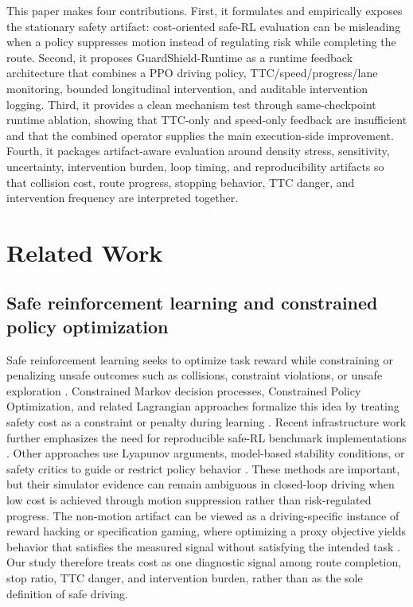 \documentclass[pdflatex,sn-mathphys-ay]{sn-jnl}
\begin{document}
This paper makes four contributions. First, it formulates and empirically exposes the stationary safety artifact: cost-oriented safe-RL evaluation can be misleading when a policy suppresses motion instead of regulating risk while completing the route. Second, it proposes GuardShield-Runtime as a runtime feedback architecture that combines a PPO driving policy, TTC/speed/progress/lane monitoring, bounded longitudinal intervention, and auditable intervention logging. Third, it provides a clean mechanism test through same-checkpoint runtime ablation, showing that TTC-only and speed-only feedback are insufficient and that the combined operator supplies the main execution-side improvement. Fourth, it packages artifact-aware evaluation around density stress, sensitivity, uncertainty, intervention burden, loop timing, and reproducibility artifacts so that collision cost, route progress, stopping behavior, TTC danger, and intervention frequency are interpreted together.

\section{Related Work}\label{sec_related_work}

\subsection{Safe reinforcement learning and constrained policy optimization}
Safe reinforcement learning seeks to optimize task reward while constraining or penalizing unsafe outcomes such as collisions, constraint violations, or unsafe exploration \citep{garcia2015safe,amodei2016concrete,leike2017ai}. Constrained Markov decision processes, Constrained Policy Optimization, and related Lagrangian approaches formalize this idea by treating safety cost as a constraint or penalty during learning \citep{altman1999constrained,achiam2017constrained,tessler2018reward}. Recent infrastructure work further emphasizes the need for reproducible safe-RL benchmark implementations \citep{ji2024omnisafe}. Other approaches use Lyapunov arguments, model-based stability conditions, or safety critics to guide or restrict policy behavior \citep{berkenkamp2017safe,chow2018lyapunov,dalal2018safe}. These methods are important, but their simulator evidence can remain ambiguous in closed-loop driving when low cost is achieved through motion suppression rather than risk-regulated progress. The non-motion artifact can be viewed as a driving-specific instance of reward hacking or specification gaming, where optimizing a proxy objective yields behavior that satisfies the measured signal without satisfying the intended task \citep{amodei2016concrete,pan2022reward,skalse2022defining}. Our study therefore treats cost as one diagnostic signal among route completion, stop ratio, TTC danger, and intervention burden, rather than as the sole definition of safe driving.
\end{document}
